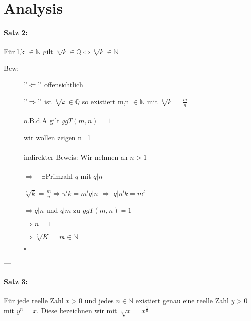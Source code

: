 \documentclass[12pt,a4paper]{article}
\author{ Rüdiger Brecht }
\begin{document}
\part*{Analysis }


\subsection*{Satz 2:} Für l,k $ \in \mathbb{N} $ gilt $\sqrt[n]{k}\in \mathbb{Q} \Leftrightarrow \sqrt[l]{k}\in \mathbb{N}$


\begin{description}
\item[Bew:] $"\Leftarrow "$ offensichtlich

$" \Rightarrow "$ ist $\sqrt[l]{k} \in \mathbb{Q}$ so existiert m,n $\in \mathbb{N}$ mit 
$\sqrt[l]{k}=\frac{m}{n}$ 
\\
\\
o.B.d.A gilt $ggT(m,n)=1$ 

wir wollen zeigen n=1
\\
\\
indirekter Beweis: Wir nehmen an $n>1$
\\
\\
$\Rightarrow \quad \exists$Primzahl $q$ mit $q|n$

$\sqrt[l]{k}=\frac{m}{n}\Rightarrow n^{l}k=m^{l}
q|n$ $\Rightarrow$ $q|n^{l}k = m^{l}$

$\Rightarrow q|n$ und $q|m $ \blitze zu $ggT(m,n)=1$

$\Rightarrow n=1$

$\Rightarrow \sqrt[l]{K}=m \in \mathbb{N} $
\begin{flushright} $ \square $ \end{flushright}
\end{description}
---
\subsection*{Satz 3:} Für jede reelle Zahl $x>0$ und jedes $n\in \mathbb{N}$ existiert genau eine reelle Zahl $y>0$ mit $y^{n}=x$.
Diese bezeichnen wir mit $\sqrt[n]{x}=x^{\frac{1}{n}}$
\end{document}

